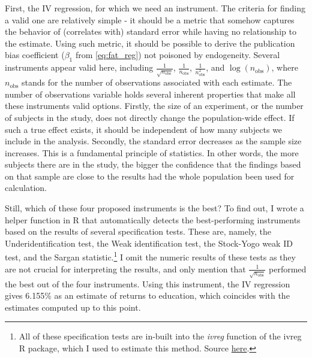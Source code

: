 First, the \ac{IV} regression, for which we need an instrument. The criteria for finding a valid one are relatively simple - it should be a metric that somehow captures the behavior of (correlates with) standard error while having no relationship to the estimate. Using such metric, it should be possible to derive the publication bias coefficient ($\beta_1$ from \autoref{eq:fat_reg}) not poisoned by endogeneity. Several instruments appear valid here, including $\frac{1}{\sqrt{n_{\text{obs}}}}$, $\frac{1}{n_{\text{obs}}}$, $\frac{1}{n_{\text{obs}}^2}$, and $\log(n_{\text{obs}})$, where $n_{\text{obs}}$ stands for the number of observations associated with each estimate. The number of observations variable holds several inherent properties that make all these instruments valid options. Firstly, the size of an experiment, or the number of subjects in the study, does not directly change the population-wide effect. If such a true effect exists, it should be independent of how many subjects we include in the analysis. Secondly, the standard error decreases as the sample size increases. This is a fundamental principle of statistics. In other words, the more subjects there are in the study, the bigger the confidence that the findings based on that sample are close to the results had the whole population been used for calculation.

Still, which of these four proposed instruments is the best? To find out, I wrote a helper function in R that automatically detects the best-performing instruments based on the results of several specification tests. These are, namely, the Underidentification test, the Weak identification test, the Stock-Yogo weak ID test, and the Sargan statistic.\footnote{All of these specification tests are in-built into the \textit{ivreg} function of the {ivreg} R package, which I used to estimate this method. Source \href{https://cran.r-project.org/package=ivreg}{here}.} I omit the numeric results of these tests as they are not crucial for interpreting the results, and only mention that $\frac{1}{\sqrt{n_{\text{obs}}}}$ performed the best out of the four instruments. Using this instrument, the \ac{IV} regression gives 6.155\% as an estimate of returns to education, which coincides with the estimates computed up to this point.

